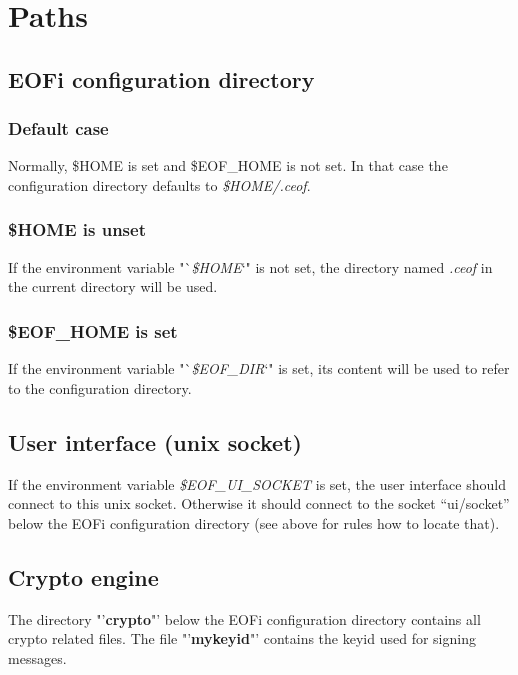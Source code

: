\documentclass[12pt,a4paper]{book}
\begin{document}
\section{Paths}
\subsection{EOFi configuration directory}
\subsubsection{Default case}
Normally, \$HOME is set and \$EOF\_HOME is not set. In that case
the configuration directory defaults to \textit{\$HOME/.ceof}.
\subsubsection{\$HOME is unset}
If the environment variable "`\textit{\$HOME}`" is not set,
the directory named \textit{.ceof} in the current directory will be used.
\subsubsection{\$EOF\_HOME is set}
If the environment variable "`\textit{\$EOF\_DIR}`" is set,
its content will be used to refer to the configuration directory.
\subsection{User interface (unix socket)}
\label{ui-socket}
If the environment variable \textit{\$EOF\_UI\_SOCKET} is set, the user
interface should connect to this unix socket. Otherwise it should connect
to the socket "`ui/socket"' below the EOFi configuration directory
(see above for rules how to locate that).
\subsection{Crypto engine}
\label{crypto-key}
The directory "'\textbf{crypto}"' below the EOFi configuration directory contains
all crypto related files. The file "'\textbf{mykeyid}"' contains the
keyid used for signing messages.
\end{document}
